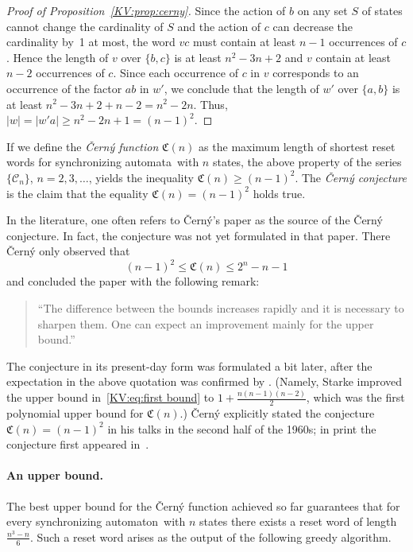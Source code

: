 \documentclass{irmaart}
\newcommand{\sa}{synchronizing au\-tom\-a\-ta}
\newcommand{\san}{synchronizing au\-tom\-a\-ton}
\theoremstyle{plain}
\begin{document}
\begin{proof}[Proof of Proposition~\ref{KV:prop:cerny}]
Since the action of $b$ on any set $S$ of states cannot change the
cardinality of $S$ and the action of $c$ can decrease the
cardinality by~1 at most, the word $vc$ must contain at least
$n-1$ occurrences of $c$. Hence the length of $v$ over $\{b,c\}$
is at least $n^2-3n+2$ and $v$ contain at least $n-2$ occurrences
of $c$. Since each occurrence of $c$ in $v$ corresponds to an
occurrence of the factor $ab$ in $w'$, we conclude that the length
of $w'$ over $\{a,b\}$ is at least $n^2-3n+2+n-2=n^2-2n$. Thus,
$|w|=|w'a|\ge n^2-2n+1=(n-1)^2$.
\end{proof}

If we define the \emph{\v{C}ern\'{y} function}
$\mathfrak{C}(n)$ as the maximum length of shortest reset words for \sa\ with
$n$ states, the above property of the series $\{\mathcal{C}_{n}\}$,
$n=2,3,\dotsc$, yields the inequality $\mathfrak{C}(n)\ge(n-1)^2$. The
\emph{\v{C}ern\'{y} conjecture} is the claim
that the equality $\mathfrak{C}(n)=(n-1)^2$ holds true.

In the literature, one often refers to \v{C}ern\'{y}'s paper \cite{Cerny:1964}
as the source of the \v{C}ern\'{y} conjecture. In fact, the conjecture was not
yet formulated in that paper. There \v{C}ern\'{y} only observed that
\begin{equation}
\label{KV:eq:first bound} (n-1)^2\le \mathfrak{C}(n)\le 2^n-n-1
\end{equation}
and concluded the paper with the following remark:
\begin{quote}
``The difference between the bounds increases rapidly and it is necessary to
sharpen them. One can expect an improvement mainly for the upper bound.''
\end{quote}
The conjecture in its present-day form was formulated a bit later, after the
expectation in the above quotation was confirmed by \cite{Starke:1966}.
(Namely, Starke improved the upper bound in~\eqref{KV:eq:first bound} to
$1+\frac{n(n-1)(n-2)}2$, which was the first polynomial upper bound for
$\mathfrak{C}(n)$.) \v{C}ern\'{y} explicitly stated the conjecture
$\mathfrak{C}(n)=(n-1)^2$ in his talks in the second half of the 1960s; in
print the conjecture first appeared in~\cite{Cerny&Piricka&Rosenauerova:1971}.

\paragraph*{An upper bound.} The best upper bound for the \v{C}ern\'{y}
function achieved so far guarantees that for every \san\ with $n$ states there
exists a reset word of length $\frac{n^3-n}6$. Such a reset word arises as the
output of the following greedy algorithm.
\end{document}
